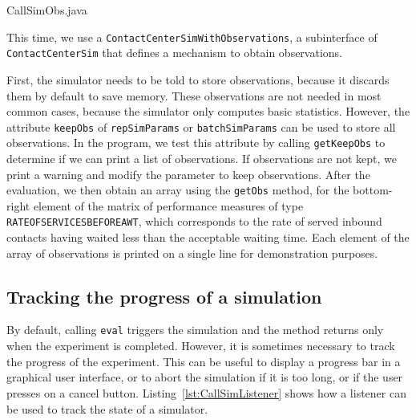 
{CallSimObs.java}

This time, we use a \texttt{Contact\-Center\-Sim\-With\-Observations},
a subinterface of \texttt{Contact\-Center\-Sim} that defines a
mechanism to obtain observations.

First, the simulator needs to
be told to store observations, because it discards them
by default to save memory. These observations are not needed
in most common cases, because
the simulator only computes
basic statistics.  However, the attribute \texttt{keep\-Obs}
of \texttt{rep\-Sim\-Params} or \texttt{batch\-Sim\-Params}
can be used to store all observations.  In the program, we
test this attribute by calling \texttt{get\-Keep\-Obs}
to determine if we can print a list of
observations.  If observations are not kept, we print a warning and
modify the parameter to keep observations.
After the evaluation, we then obtain an
array using the \texttt{get\-Obs} method,
for the bottom-right
element of the matrix of performance measures of type
\texttt{RATEOFSERVICESBEFOREAWT}, which corresponds to the rate of served
inbound contacts having waited less than the acceptable waiting time.
Each element of the
array of observations is printed on a single line for demonstration purposes.

\subsection{Tracking the progress of a simulation}

By default, calling \texttt{eval} triggers the simulation and the
method returns only when the experiment is completed.
However, it is sometimes necessary to track the progress of the
experiment.
This can be useful to display a progress bar in a graphical user
interface, or to abort the simulation if it is too long, or
if the user presses on a cancel button.
Listing~\ref{lst:CallSimListener} shows how a listener can be used to
track the state of a simulator.

